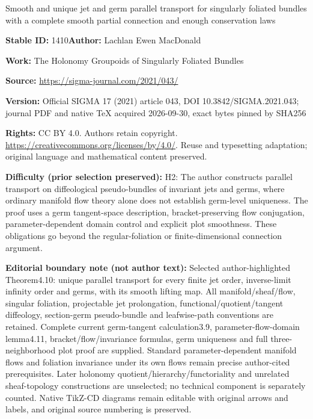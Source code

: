\documentclass[11pt]{article}
\numberwithin{equation}{section}
\numberwithin{equation}{section}
\begin{document}
\begin{center}\Large Smooth and unique jet and germ parallel transport for singularly foliated bundles with a complete smooth partial connection and enough conservation laws\end{center}
\noindent\textbf{Stable ID:} 1410\quad\textbf{Author:} Lachlan Ewen MacDonald\par
\noindent\textbf{Work:} The Holonomy Groupoids of Singularly Foliated Bundles\par
\noindent\textbf{Source:} \url{https://sigma-journal.com/2021/043/}\par
\noindent\textbf{Version:} Official SIGMA 17 (2021) article 043, DOI 10.3842/SIGMA.2021.043; journal PDF and native TeX acquired 2026-09-30, exact bytes pinned by SHA256\par
\noindent\textbf{Rights:} CC BY 4.0. Authors retain copyright. \url{https://creativecommons.org/licenses/by/4.0/}. Reuse and typesetting adaptation; original language and mathematical content preserved.\par
\noindent\textbf{Difficulty (prior selection preserved):} {\CJKfont H2: The author constructs parallel transport on diffeological pseudo-bundles of invariant jets and germs, where ordinary manifold flow theory alone does not establish germ-level uniqueness. The proof uses a germ tangent-space description, bracket-preserving flow conjugation, parameter-dependent domain control and explicit plot smoothness. These obligations go beyond the regular-foliation or finite-dimensional connection argument.}\par
\medskip\noindent\textbf{Editorial boundary note (not author text):} Selected author-highlighted Theorem4.10: unique parallel transport for every finite jet order, inverse-limit infinity order and germs, with its smooth lifting map. All manifold/sheaf/flow, singular foliation, projectable jet prolongation, functional/quotient/tangent diffeology, section-germ pseudo-bundle and leafwise-path conventions are retained. Complete current germ-tangent calculation3.9, parameter-flow-domain lemma4.11, bracket/flow/invariance formulas, germ uniqueness and full three-neighborhood plot proof are supplied. Standard parameter-dependent manifold flows and foliation invariance under its own flows remain precise author-cited prerequisites. Later holonomy quotient/hierarchy/functoriality and unrelated sheaf-topology constructions are unselected; no technical component is separately counted. Native TikZ-CD diagrams remain editable with original arrows and labels, and original source numbering is preserved.\par
\end{document}
